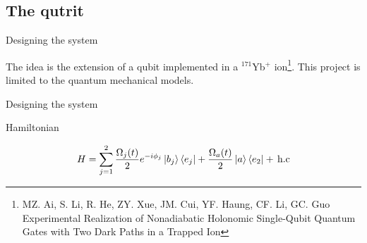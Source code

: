 \documentclass[t]{beamer}
\begin{document}
\subsection{The qutrit}
\begin{frame}{}
\tableofcontents[ 
currentsubsection, 
hideothersubsections, 
sectionstyle=show/shaded, 
subsectionstyle=show/shaded, 
] 
\end{frame}

\begin{frame}{Designing the system}

The idea is the extension of a qubit implemented in a $^{171}$Yb$^{+}$ ion\footnote{\scriptsize MZ. Ai, S. Li, R. He, ZY. Xue, JM. Cui, YF. Haung, CF. Li, GC. Guo Experimental Realization of Nonadiabatic Holonomic
Single-Qubit Quantum Gates with Two Dark Paths in a
Trapped Ion}.
This project is limited to the quantum mechanical models.

\end{frame}


\begin{frame}{Designing the system}



\begin{block}{Hamiltonian}

\begin{equation}
 H = \sum_{j = 1}^2 \frac{\Omega_j(t)}{2}e^{-i\phi_j}\ket{b_j}\bra{e_j}  + \frac{\Omega_a(t)}{2}\ket{a}\bra{e_2}  +\,\text{h.c}
\end{equation}

\end{block}

\end{frame}
\end{document}
